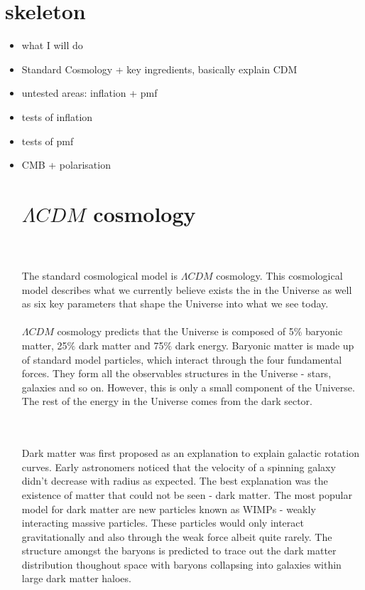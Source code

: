 \documentclass[12pt]{report}
\begin{document}
\section*{skeleton}
\begin{itemize}
\item what I will do
\item Standard Cosmology + key ingredients, basically explain \lambda CDM
\item untested areas: inflation + pmf
\item tests of inflation
\item tests of pmf
\item CMB + polarisation
\section*{}
\vspace*{\fill}

\section{$\Lambda CDM$ cosmology}

\\\\The standard cosmological model is $\Lambda CDM$ cosmology. This cosmological model describes what we currently believe exists the in the Universe as well as six key parameters that shape the Universe into what we see today.
\\\\$\Lambda CDM$ cosmology predicts that the Universe is composed of 5$\%$ baryonic matter, 25$\%$ dark matter and 75$\%$ dark energy. Baryonic matter is made up of standard model particles, which interact through the four fundamental forces. They form all the observables structures in the Universe - stars, galaxies and so on. However, this is only a small component of the Universe. The rest of the energy in the Universe comes from the dark sector. 

\\\\Dark matter was first proposed as an explanation to explain galactic rotation curves. Early astronomers noticed that the velocity of a spinning galaxy didn't decrease with radius as expected. The best explanation was the existence of matter that could not be seen - dark matter. The most popular model for dark matter are new particles known as WIMPs - weakly interacting massive particles. These particles would only interact gravitationally and also through the weak force albeit quite rarely. The structure amongst the baryons is predicted to trace out the dark matter distribution thoughout space with baryons collapsing into galaxies within large dark matter haloes.


\end{itemize}
\end{document}
